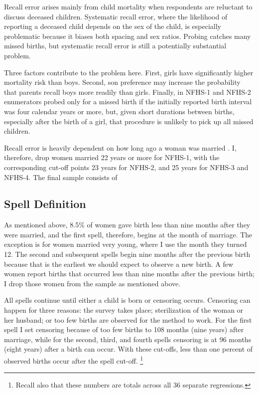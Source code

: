 \documentclass[12pt,letterpaper]{article}
\begin{document}
Recall error arises mainly from child mortality when respondents are 
reluctant to discuss deceased children.
Systematic recall error, where the likelihood of reporting a deceased 
child depends on the sex of the child, is especially problematic because 
it biases both spacing and sex ratios.
Probing catches many missed births, but systematic recall error is 
still a potentially substantial problem.

Three factors contribute to the problem here.
First, girls have significantly higher mortality risk than boys.
Second, son preference may increase the probability that parents recall boys 
more readily than girls.
Finally, in NFHS-1 and NFHS-2 enumerators probed only for a missed birth if the
initially reported birth interval was four calendar years or more,
but, given short durations between births, especially after the birth of a girl,
that procedure is unlikely to pick up all missed children.

Recall error is heavily dependent on how long ago a woman was married 
\citep{Portner2018b}.
I, therefore, drop women married 22 years or more 
for NFHS-1, with the corresponding cut-off points 23 years for NFHS-2, 
and 25 years for NFHS-3 and NFHS-4.
The final sample consists of 



\subsection{Spell Definition\label{sec:spell_def}}

As mentioned above, 8.5\% of women gave birth less than nine months
after they were married, and the first spell, therefore, begins at the 
month of marriage.
The exception is for women married very young, where I use the month they 
turned 12.
The second and subsequent spells begin nine months after the previous birth 
because that is the earliest we should expect to observe a new birth.
A few women report births that occurred less than nine months 
after the previous birth; I drop those women from the sample as mentioned above.

All spells continue until either a child is born or censoring occurs.
Censoring can happen for three reasons:
the survey takes place;
sterilization of the woman or her husband;
or too few births are observed for the method to work.
For the first spell I set censoring because of too few births to 108 months 
(nine years) after marriage,
while for the second, third, and fourth spells censoring is at 96 months 
(eight years) after a birth can occur.
With these cut-offs, less than one percent of observed births occur after
the spell cut-off.%
\footnote{

Recall also that these numbers are totals across all 36 separate regressions.
}
\end{document}

